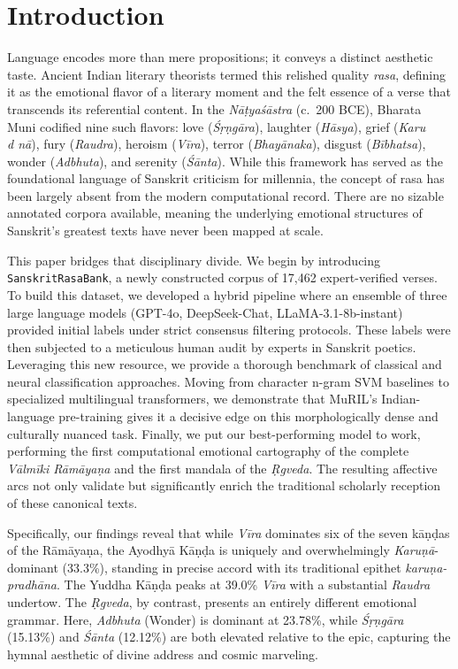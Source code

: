 \documentclass[11pt]{article}
\begin{document}
\section{Introduction}

Language encodes more than mere propositions; it conveys a distinct aesthetic taste. Ancient Indian literary theorists termed this relished quality \textit{rasa}, defining it as the emotional flavor of a literary moment and the felt essence of a verse that transcends its referential content. In the \textit{N\=a\d tyaś\=astra} (c.~200 BCE), Bharata Muni codified nine such flavors: love (\textit{Ś\d r\d ng\=ara}), laughter (\textit{H\=asya}), grief (\textit{Karu\\d n\=a}), fury (\textit{Raudra}), heroism (\textit{V\=ira}), terror (\textit{Bhay\=anaka}), disgust (\textit{B\=ibhatsa}), wonder (\textit{Adbhuta}), and serenity (\textit{Ś\=anta}). While this framework has served as the foundational language of Sanskrit criticism for millennia, the concept of rasa has been largely absent from the modern computational record. There are no sizable annotated corpora available, meaning the underlying emotional structures of Sanskrit's greatest texts have never been mapped at scale.

This paper bridges that disciplinary divide. We begin by introducing \texttt{SanskritRasaBank}, a newly constructed corpus of 17,462 expert-verified verses. To build this dataset, we developed a hybrid pipeline where an ensemble of three large language models (GPT-4o, DeepSeek-Chat, LLaMA-3.1-8b-instant) provided initial labels under strict consensus filtering protocols. These labels were then subjected to a meticulous human audit by experts in Sanskrit poetics. Leveraging this new resource, we provide a thorough benchmark of classical and neural classification approaches. Moving from character n-gram SVM baselines to specialized multilingual transformers, we demonstrate that MuRIL's Indian-language pre-training gives it a decisive edge on this morphologically dense and culturally nuanced task. Finally, we put our best-performing model to work, performing the first computational emotional cartography of the complete \textit{V\=alm\=iki R\=am\=aya\d na} and the first mandala of the \textit{\d Rgveda}. The resulting affective arcs not only validate but significantly enrich the traditional scholarly reception of these canonical texts.

Specifically, our findings reveal that while \textit{V\=ira} dominates six of the seven k\=a\d n\d das of the R\=am\=aya\d na, the Ayodhy\=a K\=a\d n\d da is uniquely and overwhelmingly \textit{Karu\d n\=a}-dominant (33.3\%), standing in precise accord with its traditional epithet \textit{karu\d na-pradh\=ana}. The Yuddha K\=a\d n\d da peaks at 39.0\% \textit{V\=ira} with a substantial \textit{Raudra} undertow. The \textit{\d Rgveda}, by contrast, presents an entirely different emotional grammar. Here, \textit{Adbhuta} (Wonder) is dominant at 23.78\%, while \textit{Ś\d r\d ng\=ara} (15.13\%) and \textit{Ś\=anta} (12.12\%) are both elevated relative to the epic, capturing the hymnal aesthetic of divine address and cosmic marveling.
\end{document}
